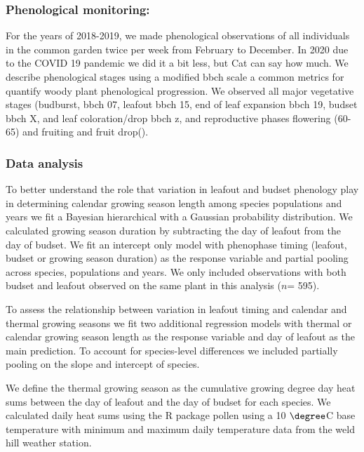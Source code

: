 \documentclass{article}[12pt]
\begin{document}
\subsubsection{Phenological monitoring:}
For the years of 2018-2019, we made phenological observations of all individuals in the common garden twice per week from February to December. In 2020 due to the COVID 19 pandemic we did it a bit less, but Cat can say how much.
We describe phenological stages using a modified bbch scale \citep{} a common metrics for quantify woody plant phenological progression. We observed all major vegetative stages (budburst, bbch 07, leafout bbch 15, end of leaf expansion bbch 19, budset bbch X, and leaf coloration/drop bbch z, and reproductive phases flowering (60-65) and fruiting and fruit drop(). 

\subsubsection{Data analysis}
To better understand the role that variation in leafout and budset phenology play in determining calendar growing season length among species populations and years we fit a Bayesian hierarchical with a Gaussian probability distribution. We calculated growing season duration by subtracting the day of leafout from the day of budset. We fit an intercept only model with phenophase timing (leafout, budset or growing season duration) as the response variable and partial pooling across species, populations and years. We only included observations with both budset and leafout observed on the same plant in this analysis ($n$= 595).

To assess the relationship between variation in leafout timing and calendar and thermal growing seasons we fit two additional regression models with thermal or calendar growing season length as the response variable and day of leafout as the main prediction. To account for species-level differences we included partially pooling on the slope and intercept of species.

We define the thermal growing season as the cumulative growing degree day heat sums between the day of leafout and the day of budset for each species. We calculated daily heat sums using the R package pollen \citep{} using a 10 $\degree$C base temperature with minimum and maximum daily temperature data from the weld hill weather station.
\end{document}
